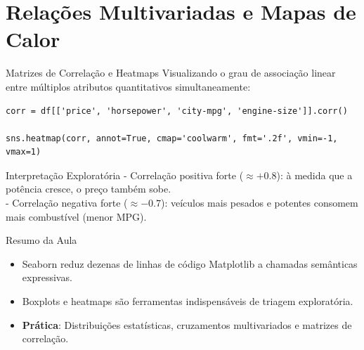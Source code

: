\documentclass[aspectratio=169, 10pt]{beamer}
\begin{document}
\section{Relações Multivariadas e Mapas de Calor}

\begin{frame}[fragile]{Matrizes de Correlação e Heatmaps}
  Visualizando o grau de associação linear entre múltiplos atributos quantitativos simultaneamente:
  \begin{lstlisting}
corr = df[['price', 'horsepower', 'city-mpg', 'engine-size']].corr()

sns.heatmap(corr, annot=True, cmap='coolwarm', fmt='.2f', vmin=-1, vmax=1)
  \end{lstlisting}
  \begin{block}{Interpretação Exploratória}
    - Correlação positiva forte ($\approx +0.8$): à medida que a potência cresce, o preço também sobe. \\
    - Correlação negativa forte ($\approx -0.7$): veículos mais pesados e potentes consomem mais combustível (menor MPG).
  \end{block}
\end{frame}

\begin{frame}{Resumo da Aula}
  \begin{itemize}
    \item Seaborn reduz dezenas de linhas de código Matplotlib a chamadas semânticas expressivas.
    \item Boxplots e heatmaps são ferramentas indispensáveis de triagem exploratória.
    \item \textbf{Prática}: Distribuições estatísticas, cruzamentos multivariados e matrizes de correlação.
  \end{itemize}
\end{frame}
\end{document}
